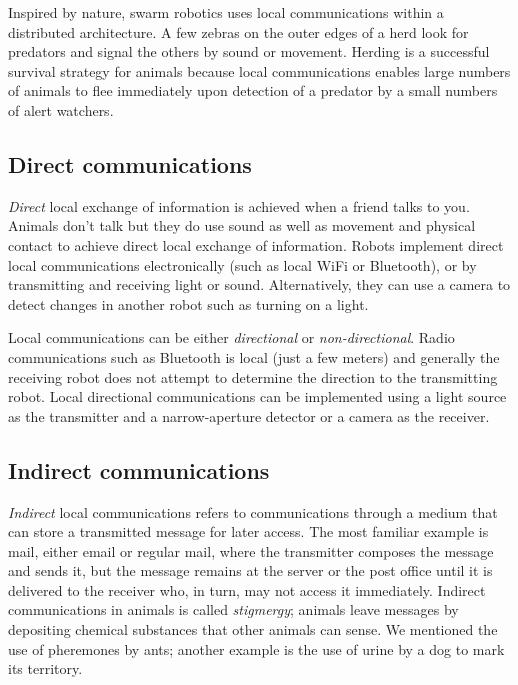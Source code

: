 Inspired by nature, swarm robotics uses local communications within a distributed architecture. A few zebras on the outer edges of a herd look for predators and signal the others by sound or movement. Herding is a successful survival strategy for animals because local communications enables large numbers of animals to flee immediately upon detection of a predator by a small numbers of alert watchers.

\subsection{Direct communications}

\emph{Direct} local exchange of information is achieved when a friend talks to you. Animals don't talk but they do use sound as well as movement and physical contact to achieve direct local exchange of information. Robots implement direct local communications electronically (such as local WiFi or Bluetooth), or by transmitting and receiving light or sound. Alternatively, they can use a camera to detect changes in another robot such as turning on a light. 

Local communications can be either \emph{directional} or \emph{non-directional}. Radio communications such as Bluetooth is local (just a few meters) and generally the receiving robot does not attempt to determine the direction to the transmitting robot. Local directional communications can be implemented using a light source as the transmitter and a narrow-aperture detector or a camera as the receiver.

\subsection{Indirect communications}

\emph{Indirect} local communications refers to communications through a medium that can store a transmitted message for later access. The most familiar example is mail, either email or regular mail, where the transmitter composes the message and sends it, but the message remains at the server or the post office until it is delivered to the receiver who, in turn, may not access it immediately. Indirect communications in animals is called \emph{stigmergy}; animals leave messages by depositing chemical substances that other animals can sense. We mentioned the use of pheremones by ants; another example is the use of urine by a dog to mark its territory.

